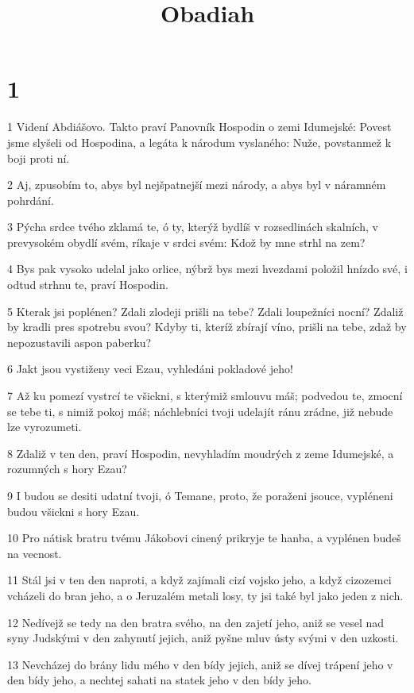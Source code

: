 

\title{Obadiah}

\chapter{1}

\par 1 Videní Abdiášovo. Takto praví Panovník Hospodin o zemi Idumejské: Povest jsme slyšeli od Hospodina, a legáta k národum vyslaného: Nuže, povstanmež k boji proti ní.
\par 2 Aj, zpusobím to, abys byl nejšpatnejší mezi národy, a abys byl v náramném pohrdání.
\par 3 Pýcha srdce tvého zklamá te, ó ty, kterýž bydlíš v rozsedlinách skalních, v prevysokém obydlí svém, ríkaje v srdci svém: Kdož by mne strhl na zem?
\par 4 Bys pak vysoko udelal jako orlice, nýbrž bys mezi hvezdami položil hnízdo své, i odtud strhnu te, praví Hospodin.
\par 5 Kterak jsi poplénen? Zdali zlodeji prišli na tebe? Zdali loupežníci nocní? Zdaliž by kradli pres spotrebu svou? Kdyby ti, kteríž zbírají víno, prišli na tebe, zdaž by nepozustavili aspon paberku?
\par 6 Jakt jsou vystiženy veci Ezau, vyhledáni pokladové jeho!
\par 7 Až ku pomezí vystrcí te všickni, s kterýmiž smlouvu máš; podvedou te, zmocní se tebe ti, s nimiž pokoj máš; náchlebníci tvoji udelajít ránu zrádne, již nebude lze vyrozumeti.
\par 8 Zdaliž v ten den, praví Hospodin, nevyhladím moudrých z zeme Idumejské, a rozumných s hory Ezau?
\par 9 I budou se desiti udatní tvoji, ó Temane, proto, že poraženi jsouce, vypléneni budou všickni s hory Ezau.
\par 10 Pro nátisk bratru tvému Jákobovi cinený prikryje te hanba, a vyplénen budeš na vecnost.
\par 11 Stál jsi v ten den naproti, a když zajímali cizí vojsko jeho, a když cizozemci vcházeli do bran jeho, a o Jeruzalém metali losy, ty jsi také byl jako jeden z nich.
\par 12 Nedívejž se tedy na den bratra svého, na den zajetí jeho, aniž se vesel nad syny Judskými v den zahynutí jejich, aniž pyšne mluv ústy svými v den uzkosti.
\par 13 Nevcházej do brány lidu mého v den bídy jejich, aniž se dívej trápení jeho v den bídy jeho, a nechtej sahati na statek jeho v den bídy jeho.

